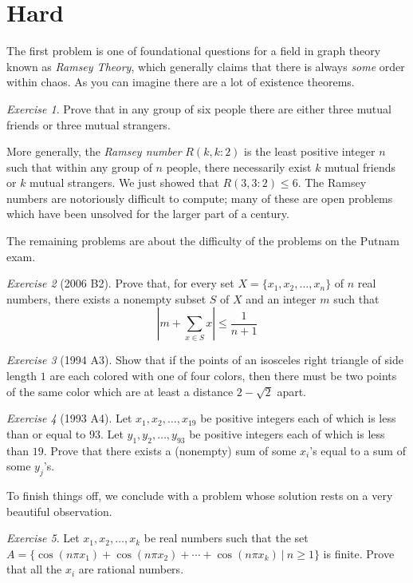 \documentclass{article}
\theoremstyle{definition}
\theoremstyle{remark}
\newtheorem{exercise}{Exercise}
\begin{document}
\section{Hard}

The first problem is one of foundational questions for a field in graph theory known as \emph{Ramsey Theory}, which generally claims that there is always \emph{some} order within chaos. As you can imagine there are a lot of existence theorems.
\begin{exercise}
Prove that in any group of six people there are either three mutual friends or three mutual strangers.
\end{exercise}
More generally, the \emph{Ramsey number} $R(k,k:2)$ is the least positive integer $n$ such that within any group of $n$ people, there necessarily exist $k$ mutual friends or $k$ mutual strangers. We just showed that $R(3,3:2)\leq 6$. The Ramsey numbers are notoriously difficult to compute; many of these are open problems which have been unsolved for the larger part of a century.

The remaining problems are about the difficulty of the problems on the Putnam exam.

\begin{exercise}[2006 B2]
Prove that, for every set $X=\{x_1,x_2,\dots,x_n\}$ of $n$ real numbers, there exists a nonempty subset $S$ of $X$ and an integer $m$ such that 
\[\left|m+\sum_{x\in S} x\right| \leq \frac{1}{n+1}\]
\end{exercise}

\begin{exercise}[1994 A3]
Show that if the points of an isosceles right triangle of side length $1$ are each colored with one of four colors, then there must be two points of the same color which are at least a distance $2-\sqrt{2}$ apart. 
\end{exercise}

\begin{exercise}[1993 A4]
Let $x_1,x_2,\dots,x_{19}$ be positive integers each of which is less than or equal to $93$. Let $y_1,y_2,\dots,y_{93}$ be positive integers each of which is less than $19$. Prove that there exists a (nonempty) sum of some $x_{i}$'s equal to a sum of some $y_j$'s.
\end{exercise}

To finish things off, we conclude with a problem whose solution rests on a very beautiful observation.
\begin{exercise}
Let $x_1,x_2,\dots,x_k$ be real numbers such that the set $A=\{\cos(n\pi x_1)+\cos(n\pi x_2)+\cdots+\cos(n\pi x_k)\  |\  n\geq 1\}$ is finite. Prove that all the $x_i$ are rational numbers.
\end{exercise}
\end{document}
